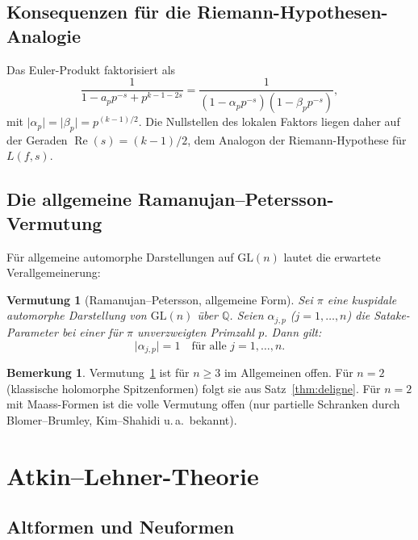 \documentclass[12pt,a4paper]{amsart}
\newtheorem{conjecture}[theorem]{Vermutung}
\theoremstyle{definition}
\newtheorem{bemerkung}[theorem]{Bemerkung}
\begin{document}
\subsection{Konsequenzen f\"ur die Riemann-Hypothesen-Analogie}

Das Euler-Produkt faktorisiert als
\[
  \frac{1}{1 - a_p p^{-s} + p^{k-1-2s}} = \frac{1}{(1-\alpha_p p^{-s})(1-\beta_p p^{-s})},
\]
mit $\lvert\alpha_p\rvert = \lvert\beta_p\rvert = p^{(k-1)/2}$. Die Nullstellen
des lokalen Faktors liegen daher auf der Geraden $\operatorname{Re}(s) = (k-1)/2$,
dem Analogon der Riemann-Hypothese f\"ur $L(f,s)$.

\subsection{Die allgemeine Ramanujan--Petersson-Vermutung}

F\"ur allgemeine automorphe Darstellungen auf $\mathrm{GL}(n)$ lautet die
erwartete Verallgemeinerung:

\begin{conjecture}[Ramanujan--Petersson, allgemeine Form]\label{conj:rp-allg}
  Sei $\pi$ eine kuspidale automorphe Darstellung von $\mathrm{GL}(n)$
  \"uber $\mathbb{Q}$. Seien $\alpha_{j,p}$ ($j=1,\ldots,n$) die Satake-Parameter
  bei einer f\"ur $\pi$ unverzweigten Primzahl $p$. Dann gilt:
  \[
    \lvert\alpha_{j,p}\rvert = 1 \quad \text{f\"ur alle } j=1,\ldots,n.
  \]
\end{conjecture}

\begin{bemerkung}
  Vermutung~\ref{conj:rp-allg} ist f\"ur $n \ge 3$ im Allgemeinen offen.
  F\"ur $n=2$ (klassische holomorphe Spitzenformen) folgt sie aus
  Satz~\ref{thm:deligne}. F\"ur $n=2$ mit Maass-Formen ist die volle Vermutung
  offen (nur partielle Schranken durch Blomer--Brumley, Kim--Shahidi u.\,a.\ bekannt).
\end{bemerkung}

\section{Atkin--Lehner-Theorie}

\subsection{Altformen und Neuformen}
\end{document}
